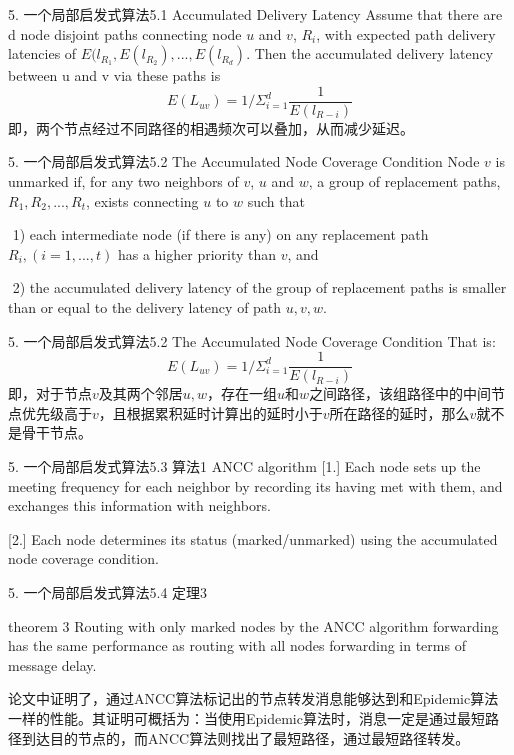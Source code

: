 \documentclass[12pt,aspectratio=43,table]{beamer}
\begin{document}
\begin{frame}{5. 一个局部启发式算法}{5.1 Accumulated Delivery Latency}
Assume that there are d node disjoint paths connecting node $u$ and $v$, $R_i$, with expected path delivery latencies of $E(l_{R_1}, E(l_{R_2}),...,E(l_{R_d})$. Then the accumulated delivery latency between u and v via these paths is
\begin{equation}
E(L_{uv})=1/\Sigma^{d}_{i=1}\frac{1}{E(l_{R-i})}
\end{equation}
即，两个节点经过不同路径的相遇频次可以叠加，从而减少延迟。
\end{frame}

\begin{frame}{5. 一个局部启发式算法}{5.2 The Accumulated Node Coverage Condition}
Node $v$ is unmarked if, for any two neighbors of $v$, $u$ and $w$, a group of replacement paths, $R_1, R_2,...,R_t$, exists connecting $u$ to $w$ such that

​	1) each intermediate node (if there is any) on any replacement path $R_i,(i = 1,...,t)$ has a higher priority than $v$, and

​	2) the accumulated delivery latency of the group of replacement paths is smaller than or equal to the delivery latency of path $u, v, w$.
\end{frame}

\begin{frame}{5. 一个局部启发式算法}{5.2 The Accumulated Node Coverage Condition}
That is:
\begin{equation}
E(L_{uv})=1/\Sigma^{d}_{i=1}\frac{1}{E(l_{R-i})}
\end{equation}
即，对于节点$v$及其两个邻居$u,w$，存在一组$u$和$w$之间路径，该组路径中的中间节点优先级高于$v$，且根据累积延时计算出的延时小于$v$所在路径的延时，那么$v$就不是骨干节点。
\end{frame}

\begin{frame}{5. 一个局部启发式算法}{5.3 算法1 ANCC algorithm}
[1.] Each node sets up the meeting frequency for each neighbor by recording its having met with them, and exchanges this information with neighbors.

[2.] Each node determines its status (marked/unmarked) using the accumulated node coverage condition.
\end{frame}

\begin{frame}{5. 一个局部启发式算法}{5.4 定理3}
\begin{block}{theorem 3}
Routing with only marked nodes by the ANCC algorithm forwarding has the same performance as routing with all nodes forwarding in terms of message delay.
\end{block}
论文中证明了，通过ANCC算法标记出的节点转发消息能够达到和Epidemic算法一样的性能。其证明可概括为：当使用Epidemic算法时，消息一定是通过最短路径到达目的节点的，而ANCC算法则找出了最短路径，通过最短路径转发。
\end{frame}
\end{document}

